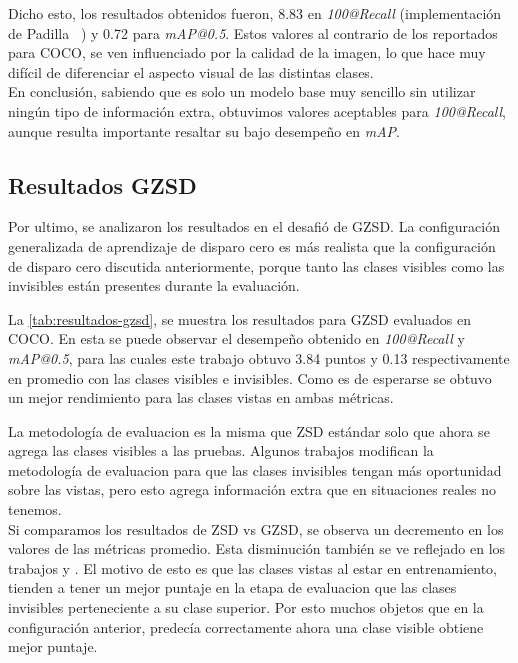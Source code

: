 Dicho esto, los resultados obtenidos fueron, 8.83 en \textit{100@Recall} (implementación de Padilla \etal~\cite{padilla2020survey}) y 0.72 para \textit{mAP@0.5}. Estos valores al contrario de los reportados para COCO, se ven influenciado por la calidad de la imagen, lo que hace muy difícil de diferenciar el aspecto visual de las distintas clases.\\

En conclusión, sabiendo que es solo un modelo base muy sencillo sin utilizar ningún tipo de información extra, obtuvimos valores aceptables para \textit{100@Recall}, aunque resulta importante resaltar su bajo desempeño en \textit{mAP}. 

\subsection{Resultados GZSD}
Por ultimo, se analizaron los resultados en el desafió de GZSD. La configuración generalizada de aprendizaje de disparo cero es más realista que la configuración de disparo cero discutida anteriormente, porque tanto las clases visibles como las invisibles están presentes durante la evaluación.

La \autoref{tab:resultados-gzsd}, se muestra los resultados para GZSD evaluados en COCO. En esta se puede observar el desempeño obtenido en \textit{100@Recall} y \textit{mAP@0.5}, para las cuales este trabajo obtuvo 3.84 puntos y 0.13 respectivamente en promedio con las clases visibles e invisibles. Como es de esperarse se obtuvo un mejor rendimiento para las clases vistas en ambas métricas.

La metodología de evaluacion es la misma que ZSD estándar solo que ahora se agrega las clases visibles a las pruebas. Algunos trabajos modifican la metodología de evaluacion para que las clases invisibles tengan más oportunidad sobre las vistas, pero esto agrega información extra que en situaciones reales no tenemos.\\

Si comparamos los resultados de ZSD vs GZSD, se observa un decremento en los valores de las métricas promedio. Esta disminución también se ve reflejado en los trabajos \cite{bansal2018zero} y \cite{rahman2020zero}. El motivo de esto es que las clases vistas al estar en entrenamiento, tienden a tener un mejor puntaje en la etapa de evaluacion que las clases invisibles perteneciente a su clase superior. Por esto muchos objetos que en la configuración anterior, predecía correctamente ahora una clase visible obtiene mejor puntaje.\\


